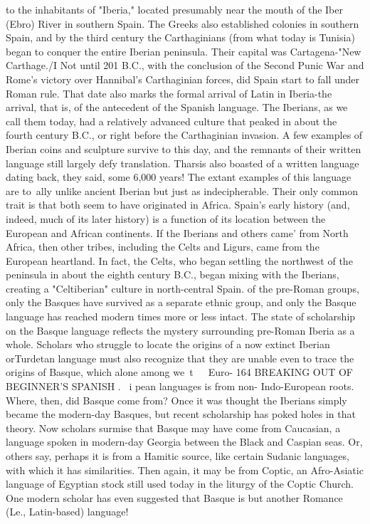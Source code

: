 \documentclass[14pt,a4paper,oneside]{memoir}
\begin{document}
{{{{to the inhabitants of "Iberia," located presumably near the mouth of
the Iber (Ebro) River in southern Spain. The Greeks also established
colonies in southern Spain, and by the third century the Carthaginians (from what today is Tunisia) began to conquer the entire Iberian
peninsula. Their capital was Cartagena-"New Carthage./I Not until
201 B.C., with the conclusion of the Second Punic War and Rome's victory over Hannibal's Carthaginian forces, did Spain start to fall under
Roman rule. That date also marks the formal arrival of Latin in Iberia-the arrival, that is, of the antecedent of the Spanish language.
The Iberians, as we call them today, had a relatively advanced
culture that peaked in about the fourth century B.C., or right before
the Carthaginian invasion. A few examples of Iberian coins and sculpture survive to this day, and the remnants of their written language
still largely defy translation. Tharsis also boasted of a written language dating back, they said, some 6,000 years! The extant examples
of this language are to~ally unlike ancient Iberian but just as indecipherable. Their only common trait is that both seem to have originated in Africa.
Spain's early history (and, indeed, much of its later history) is a
function of its location between the European and African continents.
If the Iberians and others came' from North Africa, then other tribes,
including the Celts and Ligurs, came from the European heartland. In
fact, the Celts, who began settling the northwest of the peninsula in
about the eighth century B.C., began mixing with the Iberians, creating
a "Celtiberian" culture in north-central Spain.
of the pre-Roman groups, only the Basques have survived
as a separate ethnic group, and only the Basque language has reached
modern times more or less intact. The state of scholarship on the
Basque language reflects the mystery surrounding pre-Roman Iberia
as a whole. Scholars who struggle to locate the origins of a now extinct
Iberian orTurdetan language must also recognize that they are unable
even to trace the origins of Basque, which alone among we~t~~~Euro-
164 BREAKING OUT OF BEGINNER'S SPANISH
.~
i
pean languages is from non- Indo-European roots. Where, then, did
Basque come from? Once it was thought the Iberians simply became
the modern-day Basques, but recent scholarship has poked holes in
that theory. Now scholars surmise that Basque may have come from
Caucasian, a language spoken in modern-day Georgia between the
Black and Caspian seas. Or, others say, perhaps it is from a Hamitic
source, like certain Sudanic languages, with which it has similarities.
Then again, it may be from Coptic, an Afro-Asiatic language of Egyptian stock still used today in the liturgy of the Coptic Church. One
modern scholar has even suggested that Basque is but another Romance (Le., Latin-based) language!

}}}}
\end{document}
